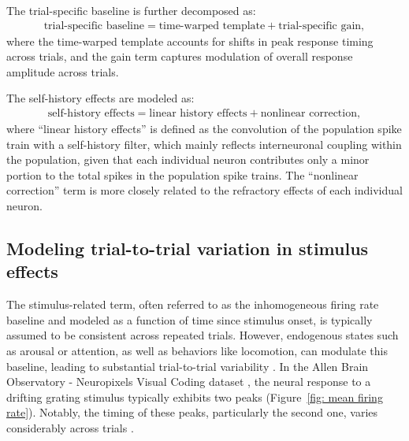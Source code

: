 \documentclass[12pt]{article}
\begin{document}
The trial-specific baseline is further decomposed as:
\begin{align*}
\text{trial-specific baseline} = \text{time-warped template} + \text{trial-specific gain},
\end{align*}
where the time-warped template accounts for shifts in peak response timing across trials, and the gain term captures modulation of overall response amplitude across trials.

The self-history effects are modeled as:
\begin{align*}
\text{self-history effects} = \text{linear history effects} + \text{nonlinear correction},
\end{align*}
where ``linear history effects'' is defined as the convolution of the population spike train with a self-history filter, which mainly reflects interneuronal coupling within the population, given that each individual neuron contributes only a minor portion to the total spikes in the population spike trains. The ``nonlinear correction'' term is more closely related to the refractory effects of each individual neuron. 


\subsection{Modeling trial-to-trial variation in stimulus effects}
\label{sec:Modeling trial-to-trial variation in stimulus effects}

The stimulus-related term, often referred to as the inhomogeneous firing rate baseline and modeled as a function of time since stimulus onset, is typically assumed to be consistent across repeated trials. However, endogenous states such as arousal or attention, as well as behaviors like locomotion, can modulate this baseline, leading to substantial trial-to-trial variability \cite{international2023brain, musall2019single, stringer2019spontaneous, williams2021statistical, cowley2020slow}. In the Allen Brain Observatory - Neuropixels Visual Coding dataset \cite{allendata}, the neural response to a drifting grating stimulus typically exhibits two peaks (Figure~\ref{fig: mean firing rate}). Notably, the timing of these peaks, particularly the second one, varies considerably across trials \cite{chen2022population, olarinre2025relative}.
\end{document}
